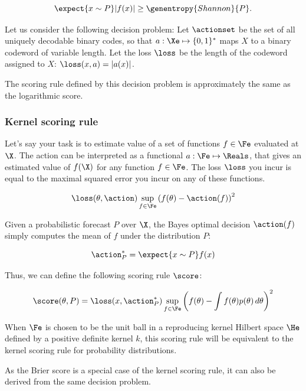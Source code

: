 \begin{equation}
	\expect{x \sim P} \vert f(x) \vert \geq \genentropy{Shannon}{P}.
\end{equation}


Let us consider the following decision problem: Let $\actionset$ be the set of all uniquely decodable binary codes, so that $a:\Xe\mapsto\{0,1\}^{*}$ maps $X$ to a binary codeword of variable length. Let the loss $\loss$ be the length of the codeword assigned to $X$: $\loss(x,a) = \vert a(x)\vert$.

The scoring rule defined by this decision problem is approximately the same as the logarithmic score.

\subsubsection{Kernel scoring rule}

Let's say your task is to estimate value of a set of functions $f\in{\Fe}$ evaluated at $\X$. The action can be interpreted as a functional $a:\Fe\mapsto\Reals$, that gives an estimated value of $f(\X)$ for any function $f\in\Fe$. The loss $\loss$ you incur is equal to the maximal squared error you incur on any of these functions.

\begin{equation}
\loss(\theta, \action) \sup_{f\in\Fe}\left( f(\theta) - \action(f)\right)^2
\end{equation}

Given a probabilistic forecast $P$ over $\X$, the Bayes optimal decision $\action(f)$ simply computes the mean of $f$ under the distribution $P$:

\begin{equation}
 \action^{*}_{P} = \expect{x\sim P} f(x)
\end{equation}

Thus, we can define the following scoring rule $\score$:

\begin{equation}
	\score(\theta,P) = \loss(x,\action^{*}_{P} )
		\sup_{f\in\Fe}\left( f(\theta) - \int f(\theta)p(\theta)\,d\theta \right)^2
\end{equation}

When $\Fe$ is chosen to be the unit ball in a reproducing kernel Hilbert space $\He$ defined by a positive definite kernel $k$, this scoring rule will be equivalent to the kernel scoring rule for probability distributions.

As the Brier score is a special case of the kernel scoring rule, it can also be derived from the same decision problem.